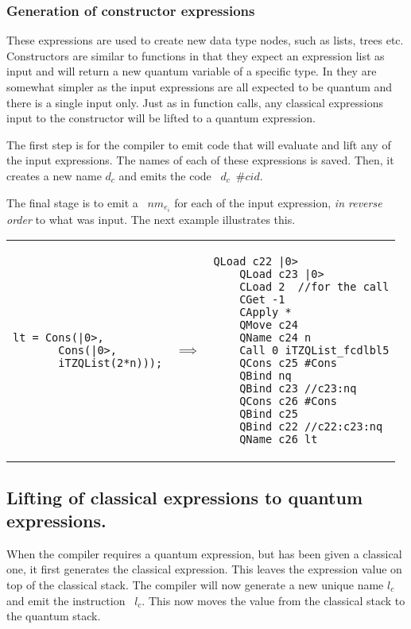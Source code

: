 \subsubsection{Generation of constructor expressions}
These expressions are used to create new data type nodes, such as lists, trees
etc. Constructors are similar to functions in that they expect 
an expression list as input and will return a new quantum variable of a
specific type. In \lqpl{} they are somewhat simpler as the input expressions
are all expected to be quantum and there is a single input only. Just as in
function calls, any classical expressions input to the constructor
will be lifted to a quantum expression.

The first step is for the compiler to emit code that will evaluate and lift
any of the input expressions. The names of each of these expressions is 
saved. Then, it creates a new name $d_c$ and emits the
code ~$d_c$~$\#cid$.

The final stage is to emit a ~$nm_{e_i}$ for each of the
input expression, \emph{in reverse order} to what was input. The next  example 
illustrates this.

\begin{center}
\begin{tabular}{p{2in}p{.3in}p{2.7in}}
{\begin{singlespace}
\begin{lstlisting}[style=linqpl]
lt = Cons(|0>, 
       Cons(|0>,
       iTZQList(2*n)));
\end{lstlisting}
\end{singlespace}}
 & { \qquad \qquad \quad \quad \qquad \qquad $\implies$} &
{\begin{singlespace}
\begin{lstlisting}[style=linqpl]
    QLoad c22 |0> 
    QLoad c23 |0>
    CLoad 2  //for the call
    CGet -1
    CApply *
    QMove c24
    QName c24 n
    Call 0 iTZQList_fcdlbl5
    QCons c25 #Cons
    QBind nq 
    QBind c23 //c23:nq
    QCons c26 #Cons
    QBind c25
    QBind c22 //c22:c23:nq
    QName c26 lt
\end{lstlisting}
\end{singlespace}}
\end{tabular}
\end{center}



\subsection{Lifting of classical expressions to quantum expressions.}\label{subsec:cglifting}
When the compiler requires a quantum expression, but has been given a
classical one, it first generates the classical expression. This leaves
the expression value on top of the classical stack. The compiler will now
generate a new unique name $l_c$ and emit the instruction 
~$l_c$. This now moves the value from the classical stack
to the quantum stack.
